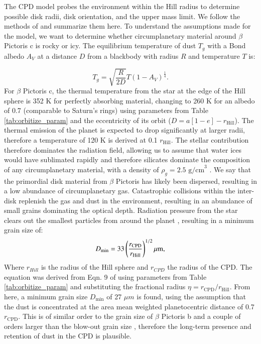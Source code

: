\documentclass{aa}
\newcommand\picb{$\beta$ Pictoris b}
\newcommand\picc{$\beta$ Pictoris c}
\newcommand\pic{$\beta$ Pictoris}
\begin{document}
The CPD model probes the environment within the Hill radius to determine possible disk radii, disk orientation, and the upper mass limit.
%
We follow the methods of \citet{Kenworthy_2021} and summarize them here.
%
To understand the assumptions made for the model, we want to determine whether circumplanetary material around \picc{} is rocky or icy. 
%
The equilibrium temperature of dust $T_g$ with a Bond albedo $A_V$ at a distance $D$ from a blackbody with radius $R$ and temperature $T$ is:

\begin{equation}
    T_g = \sqrt{\frac{R}{2D}}T (1-A_V)^\frac{1}{4}.
\end{equation}
For \picc{}, the thermal temperature from the star at the edge of the Hill sphere is 352 K for perfectly absorbing material, changing to 260 K for an albedo of 0.7 (comparable to Saturn's rings) using parameters from Table \ref{tab:orbitize_param} and the eccentricity of its orbit ($D = a[1-e]-r_{\text{Hill}}$).  
%
The thermal emission of the planet is expected to drop significantly at larger radii, therefore a temperature of 120 K is derived at 0.1 $r_{\text{Hill}}$.
%
The stellar contribution therefore dominates the radiation field, allowing us to assume that water ices would have sublimated rapidly and therefore silicates dominate the composition of any circumplanetary material, with a density of $\rho_g =\text{2.5 g/cm}^3$ \citep{Chen_Jura_2001,Li_1997}.
%
We say that the primordial disk material from \pic{} has likely been dispersed, resulting in a low abundance of circumplanetary gas.  
%
Catastrophic collisions within the inter-disk replenish the gas and dust in the environment, resulting in an abundance of small grains dominating the optical depth.
%
Radiation pressure from the star clears out the smallest particles from around the planet \citep{Kennedy_2011}, resulting in a minimum grain size of:
%
\begin{equation}
    D_{\text{min}} = 33 \left(\frac{r_{\text{\text{CPD}}}}{r_{\text{Hill}}}\right)^{1/2}  \mu \text{m},
    \label{eq:Mass}
\end{equation}
Where $r_{Hill}$ is the radius of the Hill sphere and $r_{CPD}$ the radius of the CPD.
%
The equation was derived from Eqn. 9 of \citet{Kennedy_2011} using parameters from Table \ref{tab:orbitize_param} and substituting the fractional radius $\eta = r_{\text{CPD}}/r_{\text{Hill}}$.
%
From here, a minimum grain size $D_{\text{min}}$ of 27 $\mu m$ is found, using the assumption that the dust is concentrated at the area mean weighted planetocentric distance of 0.7 $r_{\text{CPD}}$.
%
This is of similar order to the grain size of \picb{} and a couple of orders larger than the blow-out grain size \citep{Kenworthy_2021}, therefore the long-term presence and retention of dust in the CPD is plausible. 
\end{document}

